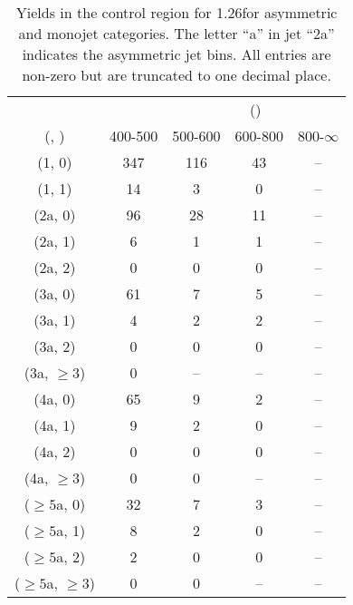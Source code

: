 \begin{table}[h!]
\tiny
\centering
\caption{Yields in the \gj control region for 1.26\ifb for asymmetric and monojet categories. The letter ``a'' in jet \eg ``2a''  indicates the asymmetric jet bins. All entries are non-zero but are truncated to one decimal place.\label{tab:yieldssep_gj_data_asym}}
\begin{tabular}
{ccccc}
	\hline\hline
&	& \multicolumn{4}{c}{\scalht (\gev)} \\ 
	 (\njet,  \nb) & 400-500 & 500-600 & 600-800 & 800-$\infty$ \\ [0.8ex] 
\hline
	(1, 0) & 347 & 116 & 43 & -- \\[0.5ex] 
	(1, 1) & 14 & 3 & 0 & -- \\[0.5ex] 
	(2a, 0) & 96 & 28 & 11 & -- \\[0.5ex] 
	(2a, 1) & 6 & 1 & 1 & -- \\[0.5ex] 
	(2a, 2) & 0 & 0 & 0 & -- \\[0.5ex] 
	(3a, 0) & 61 & 7 & 5 & -- \\[0.5ex] 
	(3a, 1) & 4 & 2 & 2 & -- \\[0.5ex] 
	(3a, 2) & 0 & 0 & 0 & -- \\[0.5ex] 
	(3a, $\ge3$) & 0 & -- & -- & -- \\[0.5ex] 
	(4a, 0) & 65 & 9 & 2 & -- \\[0.5ex] 
	(4a, 1) & 9 & 2 & 0 & -- \\[0.5ex] 
	(4a, 2) & 0 & 0 & 0 & -- \\[0.5ex] 
	(4a, $\ge3$) & 0 & 0 & -- & -- \\[0.5ex] 
	($\ge5$a, 0) & 32 & 7 & 3 & -- \\[0.5ex] 
	($\ge5$a, 1) & 8 & 2 & 0 & -- \\[0.5ex] 
	($\ge5$a, 2) & 2 & 0 & 0 & -- \\[0.5ex] 
	($\ge5$a, $\ge3$) & 0 & 0 & -- & -- \\[0.5ex] 
	\hline
	\hline
\end{tabular}
\end{table}
